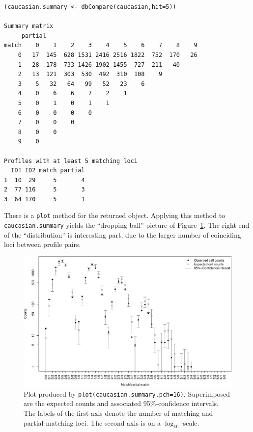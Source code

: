 \documentclass[a4paper,11pt]{article}
\newcommand{\code}[1]{\texttt{#1}}
\begin{document}
\begin{verbatim}
(caucasian.summary <- dbCompare(caucasian,hit=5))

Summary matrix
     partial
match    0    1    2    3    4    5    6    7    8    9
    0   17  145  628 1531 2416 2516 1822  752  170   26
    1   28  178  733 1426 1902 1455  727  211   40     
    2   13  121  303  530  492  310  108    9          
    3    5   32   64   99   52   23    6               
    4    0    6    6    7    2    1                    
    5    0    1    0    1    1                         
    6    0    0    0    0                              
    7    0    0    0                                   
    8    0    0                                        
    9    0                                             

Profiles with at least 5 matching loci
  ID1 ID2 match partial
1  10  29     5       4
2  77 116     5       3
3  64 170     5       1
\end{verbatim}

There is a \code{plot} method for the returned object. Applying this
method to \code{caucasian.summary} yields the ``dropping
ball''-picture of Figure~\ref{fig:caucasian}. The right end of the
``distribution'' is interesting part, due to the larger number of
coinciding loci between profile pairs.

\begin{figure}[!h]
  \centering
  \includegraphics[width=15cm]{caucasianObsExp} %
  \caption{Plot produced by
    \code{plot(caucasian.summary,pch=16)}. Superimposed are the
    expected counts and associated 95\%-confidence intervals. The
    labels of the first axis denote the number of matching and
    partial-matching loci. The second axis is on a $\log_{10}$-scale.}
  \label{fig:caucasian}
\end{figure}
\end{document}
